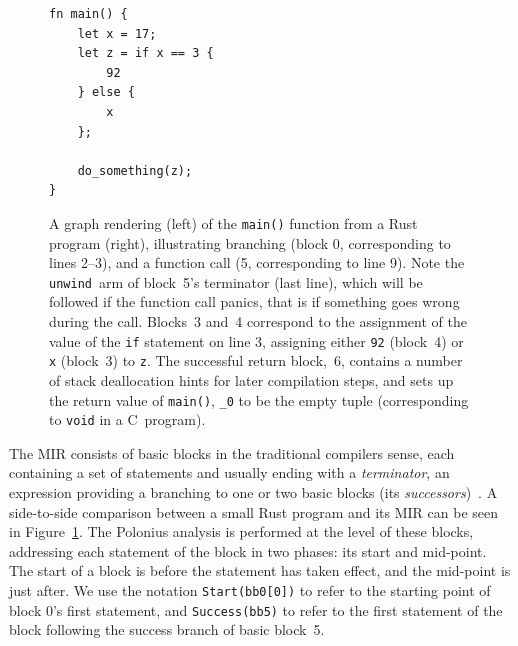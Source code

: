 \documentclass[11pt,a4paper,twoside,openany]{report}
\newenvironment{sourcecode}{\captionsetup{type=listing}}{}
\newcommand{\InRust}[1]{\texttt{#1}}
\renewcommand\_{\textunderscore\allowbreak}
\begin{document}
\begin{figure}
\begin{minipage}{.5\textwidth}
\end{minipage}%
\begin{minipage}{.5\textwidth}
  \begin{sourcecode}
  \label{lst:mir-example-input}
\begin{verbatim}
fn main() {
    let x = 17;
    let z = if x == 3 {
        92
    } else {
        x
    };

    do_something(z);
}
\end{verbatim}
\end{sourcecode}
\end{minipage}
\caption[MIR of a Small Rust Program With Function Call]{A graph rendering
  (left) of the \InRust{main()} function from a Rust program (right),
  illustrating branching (block 0, corresponding to lines 2--3), and a function
  call (5, corresponding to line 9). Note the \texttt{unwind}~arm of block~5's
  terminator (last line), which will be followed if the function call panics,
  that is if something goes wrong during the call. Blocks~3 and~4 correspond to
  the assignment of the value of the \InRust{if} statement on line 3, assigning
  either \InRust{92} (block~4) or \InRust{x} (block~3) to \InRust{z}. The
  successful return block,~6, contains a number of stack deallocation hints for
  later compilation steps, and sets up the return value of \InRust{main()},
  \InRust{_0} to be the empty tuple (corresponding to \texttt{void} in a
  C~program).}\label{fig:mir-example}
\end{figure}

The MIR consists of basic blocks in the traditional compilers sense, each
containing a set of statements and usually ending with a \emph{terminator}, an
expression providing a branching to one or two basic blocks (its
\emph{successors})~\cite{mir_rfc}. A side-to-side comparison between a small
Rust program and its MIR can be seen in Figure~\ref{fig:mir-example}. The
Polonius analysis is performed at the level of these blocks, addressing each
statement of the block in two phases: its start and mid-point. The start of a
block is before the statement has taken effect, and the mid-point is just after.
We use the notation \InRust{Start(bb0[0])} to refer to the starting point of
block 0's first statement, and \InRust{Success(bb5)} to refer to the first
statement of the block following the success branch of basic block~5.
\end{document}

